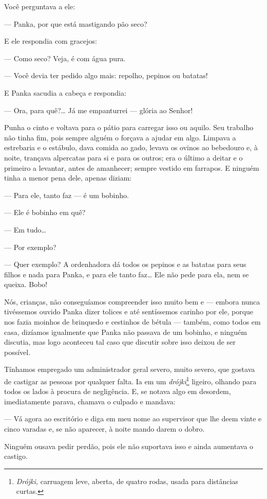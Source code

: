 Você perguntava a ele:

--- Panka, por que está mastigando pão seco?

E ele respondia com gracejos:

--- Como seco? Veja, é com água pura.

--- Você devia ter pedido algo mais: repolho, pepinos ou batatas!

E Panka sacudia a cabeça e respondia:

--- Ora, para quê?\ldots{} Já me empanturrei --- glória ao Senhor!

Punha o cinto e voltava para o pátio para carregar isso ou aquilo. Seu
trabalho não tinha fim, pois sempre alguém o forçava a ajudar em algo.
Limpava a estrebaria e o estábulo, dava comida ao gado, levava os ovinos
ao bebedouro e, à noite, trançava alpercatas para si e para os outros;
era o último a deitar e o primeiro a levantar, antes de amanhecer;
sempre vestido em farrapos. E ninguém tinha a menor pena dele, apenas
diziam:

--- Para ele, tanto faz --- é um bobinho.

--- Ele é bobinho em quê?

--- Em tudo\ldots{}

--- Por exemplo?

--- Quer exemplo? A ordenhadora dá todos os pepinos e as batatas para
seus filhos e nada para Panka, e para ele tanto faz\ldots{} Ele não pede para
ela, nem se queixa. Bobo!

Nós, crianças, não conseguíamos compreender isso muito bem e --- embora
nunca tivéssemos ouvido Panka dizer tolices e até sentíssemos carinho
por ele, porque nos fazia moinhos de brinquedo e cestinhos de bétula ---
também, como todos em casa, dizíamos igualmente que Panka não passava de
um bobinho, e ninguém discutia, mas logo aconteceu tal caso que discutir
sobre isso deixou de ser possível.

Tínhamos empregado um administrador geral severo, muito severo, que
gostava de castigar as pessoas por qualquer falta. Ia em um
\emph{drójki}\footnote{\emph{Drójki,} carruagem leve, aberta, de
  quatro rodas, usada para distâncias curtas.} ligeiro, olhando para
todos os lados à procura de negligência. E, se notava algo em desordem,
imediatamente parava, chamava o culpado e mandava:

--- Vá agora ao escritório e diga em meu nome ao supervisor que lhe deem
vinte e cinco varadas e, se não aparecer, à noite mando darem o dobro.

Ninguém ousava pedir perdão, pois ele não suportava isso e ainda
aumentava o castigo.

